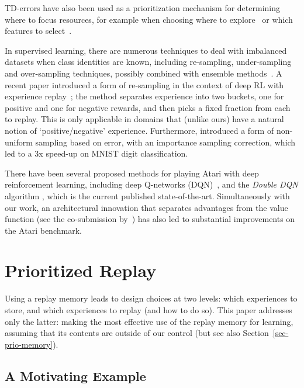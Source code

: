 \documentclass[a4paper]{article}
\begin{document}
TD-errors have also been used as a prioritization mechanism for determining where to focus resources, for example when choosing where to explore~\citep{white2014surprise} or which features to select~\citep{geramifard2011online,sun2011incremental}.


In supervised learning, there are numerous techniques to deal with imbalanced datasets
when class identities are known, including re-sampling, under-sampling and over-sampling techniques,
possibly combined with ensemble methods~\citep[for a review, see][]{imbalance-ensemble}.
A recent paper introduced a form of re-sampling in the context of deep RL with experience replay~\citep{narasimhan2015language}; the method separates experience into two buckets, one for positive and one for negative rewards, and then picks a fixed fraction from each to replay. This is only applicable in domains that (unlike ours) have a natural notion of `positive/negative' experience.
Furthermore, \citet{hinton2007} introduced a form of non-uniform sampling based on error, with an importance sampling correction,
which led to a 3x speed-up on MNIST digit classification.

There have been several proposed methods for playing Atari with deep reinforcement learning, including deep Q-networks (DQN)~\citep{dqn-workshop,dqn-nature,dagger,Stadie:2015,gorila,increasing_action_gap}, and the \emph{Double DQN} algorithm \citep{double-dqn}, which is the current published state-of-the-art.
Simultaneously with our work, an architectural innovation that separates advantages from the value function (see the co-submission by~\citealp{dueling}) 
has also led to substantial improvements on the Atari benchmark. 




\section{Prioritized Replay}
\label{sec-preplay}

Using a replay memory leads to design choices at two levels: which experiences to store,
and which experiences to replay (and how to do so). This paper addresses only the latter: making the
most effective use of the replay memory for learning, assuming that its contents are outside of our control 
(but see also Section~\ref{sec-prio-memory}).

\subsection{A Motivating Example}
\label{sec:example}
\end{document}
